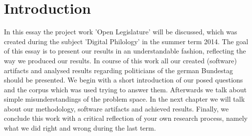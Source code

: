 \documentclass[12pt,paper=a4,nenglish]{scrreprt}
\begin{document}

\renewcommand*\contentsname{Table of contents}
\tableofcontents
\onehalfspacing

\setcounter{page}{1} 
\chapter{Introduction}
In this essay the project work 'Open Legislature' will be discussed, which was
created during the subject 'Digital Philology' in the summer term 2014.
The goal of this essay is to present our results in an understandable fashion,
reflecting the way we produced our results. 
In course of this work all our created (software) artifacts and analysed results
regarding politicians of the german Bundestag should be presented.
We begin with a short introduction of our posed questions and the corpus which
was used trying to answer them. Afterwards we talk about simple
misunderstandings of the problem space. 
In the next chapter we will talk
about our methodology, software artifacts and achieved results.
Finally, we conclude this work with a critical reflection of your own research
process, namely what we did right and wrong during the last term.
\end{document}
